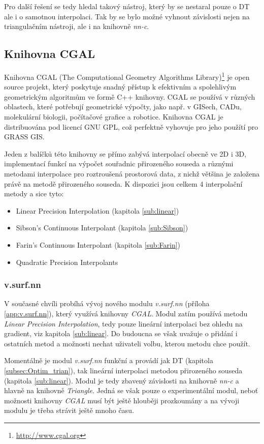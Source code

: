 \documentclass[12pt,a4paper]{article}
\begin{document}
Pro další řešení se tedy hledal takový nástroj, který by se nestaral
pouze o DT ale i o samotnou interpolaci. Tak by se bylo možné vyhnout
závislosti nejen na triangulačním nástroji, ale i na knihovně
\emph{nn-c}.

\newpage
\subsection{Knihovna CGAL}
Knihovna CGAL (The Computational Geometry Algorithms
Library)\footnote{\url{http://www.cgal.org}} je open source projekt, který
poskytuje snadný přístup k efektivním a spolehlivým geometrickým
algoritmům ve formě C++ knihovny. CGAL se používá v různých oblastech,
které potřebují geometrické výpočty, jako např. v GISech, CADu,
molekulární biologii, počítačové grafice a robotice. Knihovna CGAL je
distribuována pod licencí GNU GPL, což perfektně vyhovuje pro jeho
použítí pro GRASS GIS.

Jeden z balíčků této knihovny se přímo zabývá interpolací obecně ve 2D
i 3D, implementací funkcí na výpočet souřadnic přirozeného souseda a
různými metodami interpolace pro roztroušená prostorová data, z nichž
většina je založena právě na metodě přirozeného souseda. K dispozici
jsou celkem 4 interpolační metody a sice tyto:
\begin{itemize}
\item Linear Precision Interpolation (kapitola \ref{sub:linear})
\item Sibson's Continuous Interpolant (kapitola \ref{sub:Sibson})
\item Farin's Continuous Interpolant (kapitola \ref{sub:Farin})
\item Quadratic Precision Interpolants
\end{itemize}

\subsubsection{v.surf.nn}
\label{subsub:v.surf.nn}
V současné chvíli probíhá vývoj nového modulu \emph{v.surf.nn} (příloha \ref{app:v.surf.nn}), který
využívá knihovny \emph{CGAL}. Modul zatím používá metodu \emph{Linear Precision
Interpolation}, tedy pouze lineární interpolaci bez ohledu na gradient, viz kapitola \ref{sub:linear}. Do budoucna se
však uvažuje o přidání i ostatních metod a možnosti nechat uživateli volbu,
kterou metodu chce použít.

Momentálně je modul \emph{v.surf.nn} funkční a provádí jak DT (kapitola \ref{subsec:Optim_trian}),
tak lineární interpolaci metodou přirozeného souseda (kapitola \ref{sub:linear}).
Modul je tedy zbavený závislosti na knihovně \emph{nn-c} a hlavně na knihovně \emph{Triangle}.
Jedná se však pouze o experimentální modul, neboť možnosti knihovny \emph{CGAL} musí být ještě hlouběji prozkoumány a na vývoji modulu je třeba strávit ještě mnoho času.
\end{document}
